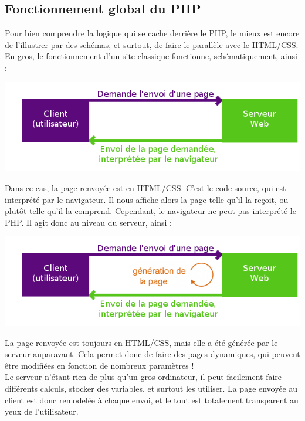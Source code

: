 \documentclass{article}
\begin{document}
\subsection{Fonctionnement global du PHP}
Pour bien comprendre la logique qui se cache derrière le PHP, le mieux est encore de l'illustrer par des schémas, et surtout, de faire le parallèle avec le HTML/CSS.\\
En gros, le fonctionnement d'un site classique fonctionne, schématiquement, ainsi : \\
\begin{center}\includegraphics[scale=0.5]{dossier-HTML.png}\end{center}
Dans ce cas, la page renvoyée est en HTML/CSS. C'est le code source, qui est interprété par le navigateur. Il nous affiche alors la page telle qu'il la reçoit, ou plutôt telle qu'il la comprend. Cependant, le navigateur ne peut pas interprété le PHP. Il agit donc au niveau du serveur, ainsi :\\
\begin{center}\includegraphics[scale=0.5]{dossier-PHP.png}\end{center}
La page renvoyée est toujours en HTML/CSS, mais elle a été générée par le serveur auparavant. Cela permet donc de faire des pages dynamiques, qui peuvent être modifiées en fonction de nombreux paramètres !\\
Le serveur n'étant rien de plus qu'un gros ordinateur, il peut facilement faire différents calculs, stocker des variables, et surtout les utiliser. La page envoyée au client est donc remodelée à chaque envoi, et le tout est totalement transparent au yeux de l'utilisateur. 
\end{document}
